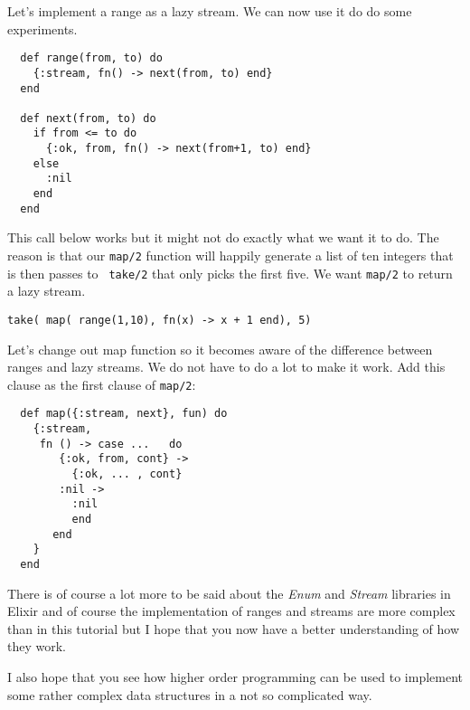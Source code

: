 \documentclass[a4paper,11pt]{article}
\begin{document}
Let's implement a range as a lazy stream. We can now use it do do some experiments. 

\begin{verbatim}
  def range(from, to) do
    {:stream, fn() -> next(from, to) end}
  end

  def next(from, to) do
    if from <= to do
      {:ok, from, fn() -> next(from+1, to) end}
    else
      :nil
    end
  end
\end{verbatim}

\noindent This call below works but it might not do exactly what we
want it to do. The reason is that our {\tt map/2} function will
happily generate a list of ten integers that is then passes to {\tt
  take/2} that only picks the first five. We want {\tt map/2} to
return a lazy stream.

\begin{verbatim}
take( map( range(1,10), fn(x) -> x + 1 end), 5)
\end{verbatim}

\noindent Let's change out map function so it becomes aware of the difference
between ranges and lazy streams. We do not have to do a lot to make it work. Add this clause as the first clause of {\tt map/2}:

\begin{verbatim}
  def map({:stream, next}, fun) do
    {:stream,
     fn () -> case ...   do
  		{:ok, from, cont} ->
  		  {:ok, ... , cont}
  		:nil ->
  		  :nil
  	      end
       end
    }
  end
\end{verbatim}

There is of course a lot more to be said about the {\em Enum} and {\em
  Stream} libraries in Elixir and of course the implementation of
ranges and streams are more complex than in this tutorial but I hope
that you now have a better understanding of how they work.

I also hope that you see how higher order programming can be used to
implement some rather complex data structures in a not so complicated
way.
\end{document}

